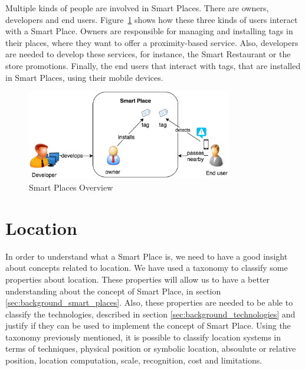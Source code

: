 Multiple kinds of people are involved in Smart Places.
There are owners, developers and end users.
Figure~\ref{fig:smart_places_overview} shows how these three kinds of users interact with a Smart Place.
Owners are responsible for managing and installing tags in their places, where they want to offer a proximity-based service.
Also, developers are needed to develop these services, for instance, the Smart Restaurant or the store promotions.
Finally, the end users that interact with tags, that are installed in Smart Places, using their mobile devices.

\begin{figure}[!ht]
  \centering
    \includegraphics[width=0.8\textwidth, keepaspectratio]{images/smart_places_overview}
    \caption[Smart Places Overview]{Smart Places Overview}
    \label{fig:smart_places_overview}
\end{figure}

\section{Location}
\label{sec:background_location}
In order to understand what a Smart Place is, we need to have a good insight about concepts related to location.
We have used a taxonomy\cite{location} to classify some properties about location.
These properties will allow us to have a better understanding about the concept of Smart Place, in section \ref{sec:background_smart_places}.
Also, these properties are needed to be able to classify the technologies, described in section \ref{sec:background_technologies} and justify if they can be used to implement the concept of Smart Place.
Using the taxonomy previously mentioned, it is possible to classify location systems in terms of techniques, physical position or symbolic location, absoulute or relative position, location computation, scale, recognition, cost and limitations.

